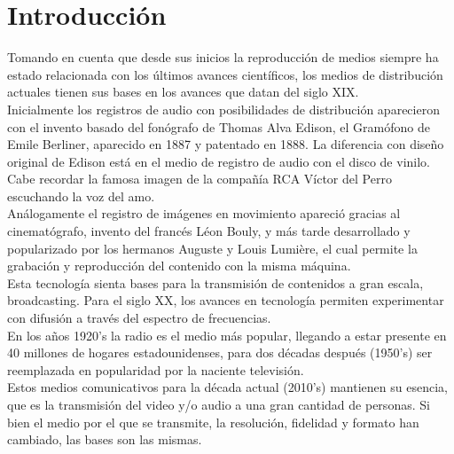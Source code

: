 \chapter{Introducción}
Tomando en cuenta que desde sus inicios la reproducción de medios siempre ha estado relacionada con los últimos avances científicos, los medios de distribución actuales tienen sus bases en los avances que datan  del siglo XIX.\\
Inicialmente los registros de audio con posibilidades de distribución aparecieron con el invento basado del fonógrafo de Thomas Alva Edison, el Gramófono de Emile Berliner, aparecido en 1887 y patentado en 1888. La diferencia con diseño original de Edison está en el medio de registro de audio con el disco de vinilo. Cabe recordar la famosa imagen de la compañía RCA Víctor del Perro escuchando la voz del amo.\\

Análogamente el registro de imágenes en movimiento apareció gracias al cinematógrafo, invento del francés Léon Bouly, y más tarde desarrollado y popularizado por los hermanos Auguste y Louis Lumière, el cual permite la grabación y reproducción del contenido con la misma máquina.\\

Esta tecnología sienta bases para la transmisión de contenidos a gran escala, broadcasting. Para el siglo XX, los avances en tecnología permiten experimentar con difusión a través del espectro de frecuencias.\\

 En los años 1920’s la radio es el medio más popular, llegando a estar presente en 40 millones de hogares estadounidenses, para dos décadas después (1950’s) ser reemplazada en popularidad por la naciente televisión.\\

	Estos medios comunicativos para la década actual (2010’s) mantienen su esencia, que es la transmisión del video y/o audio a una gran cantidad de personas. Si bien el medio por el que se transmite, la resolución, fidelidad y formato han cambiado, las bases son las mismas.\\



